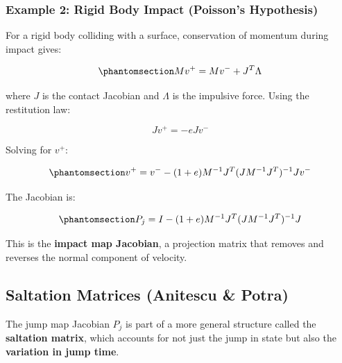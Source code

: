 \documentclass[
  letterpaper,
  DIV=11,
  numbers=noendperiod]{scrartcl}
\begin{document}
\subsubsection{Example 2: Rigid Body Impact (Poisson's
Hypothesis)}\label{example-2-rigid-body-impact-poissons-hypothesis}

For a rigid body colliding with a surface, conservation of momentum
during impact gives:

\begin{equation}\phantomsection\label{eq-impact-momentum}{
M v^+ = M v^- + J^T \Lambda
}\end{equation}

where \(J\) is the contact Jacobian and \(\Lambda\) is the impulsive
force. Using the restitution law:

\[
J v^+ = -e J v^-
\]

Solving for \(v^+\):

\begin{equation}\phantomsection\label{eq-impact-velocity}{
v^+ = v^- - (1 + e) M^{-1} J^T (J M^{-1} J^T)^{-1} J v^-
}\end{equation}

The Jacobian is:

\begin{equation}\phantomsection\label{eq-impact-jacobian}{
P_j = I - (1 + e) M^{-1} J^T (J M^{-1} J^T)^{-1} J
}\end{equation}

This is the \textbf{impact map Jacobian}, a projection matrix that
removes and reverses the normal component of velocity.

\subsection{Saltation Matrices (Anitescu \&
Potra)}\label{saltation-matrices-anitescu-potra}

The jump map Jacobian \(P_j\) is part of a more general structure called
the \textbf{saltation matrix}, which accounts for not just the jump in
state but also the \textbf{variation in jump time}.
\end{document}
